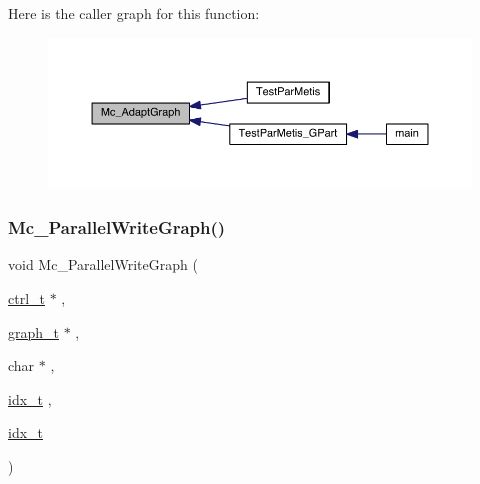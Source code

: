 Here is the caller graph for this function\+:\nopagebreak
\begin{figure}[H]
\begin{center}
\leavevmode
\includegraphics[width=350pt]{a00954_a6f07f5a19ed9d8794b6061542aa6015b_icgraph}
\end{center}
\end{figure}
\mbox{\label{a00954_a7ced85ce3eee74389db1e96de523bb13}} 
\subsubsection{\texorpdfstring{Mc\+\_\+\+Parallel\+Write\+Graph()}{Mc\_ParallelWriteGraph()}}
{\footnotesize\ttfamily void Mc\+\_\+\+Parallel\+Write\+Graph (\begin{DoxyParamCaption}\item[{\hyperlink{a00742}{ctrl\+\_\+t} $\ast$}]{,  }\item[{\hyperlink{a00734}{graph\+\_\+t} $\ast$}]{,  }\item[{char $\ast$}]{,  }\item[{\hyperlink{a00876_aaa5262be3e700770163401acb0150f52}{idx\+\_\+t}}]{,  }\item[{\hyperlink{a00876_aaa5262be3e700770163401acb0150f52}{idx\+\_\+t}}]{ }\end{DoxyParamCaption})}


